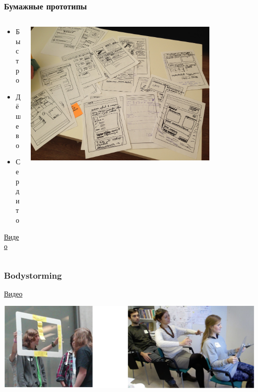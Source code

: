 \documentclass{../../slides-style}
\begin{document}
    \begin{frame}
        \frametitle{Бумажные прототипы}
        \begin{columns}
            \begin{column}{0.4\textwidth}
                \begin{itemize}
                    \item Быстро
                    \item Дёшево
                    \item Сердито
                \end{itemize}
                \href{https://www.youtube.com/watch?v=V8LNDqMIapY}{Видео}
            \end{column}
            \begin{column}{0.6\textwidth}
                \begin{center}
                    \includegraphics[width=0.8\textwidth]{paperPrototyping.png}
                \end{center}
            \end{column}
        \end{columns}
    \end{frame}

    \begin{frame}
        \frametitle{Bodystorming}
        \href{https://www.youtube.com/watch?v=AoWAnY2La5k}{Видео}
        \begin{center}
            \includegraphics[width=\textwidth]{bodystorming.png}
        \end{center}
    \end{frame}
\end{document}
